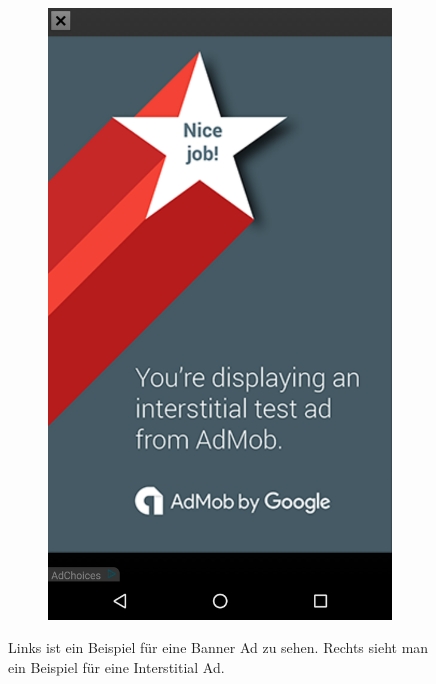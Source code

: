 \documentclass[FIPLY_base.tex]{subfiles}
\begin{document}
\begin{figure}[h]
\begin{subfigure}[b]{0.3\textwidth}
	\end{subfigure}
	\hfil
	\begin{subfigure}[b]{0.3\textwidth}
	\includegraphics[scale=0.15]{img/adsInterstitial}
	\end{subfigure}
	\caption{Links ist ein Beispiel für eine Banner Ad zu sehen. \newline Rechts sieht man ein Beispiel für eine Interstitial Ad.}
\end{figure}
\end{document}
